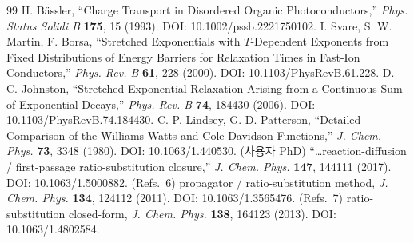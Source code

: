 \documentclass[11pt,a4paper]{article}
\begin{document}
\begin{thebibliography}{99}
 H. B\"assler, ``Charge Transport in Disordered Organic Photoconductors,''
  \emph{Phys. Status Solidi B} \textbf{175}, 15 (1993). DOI: 10.1002/pssb.2221750102.
 I. Svare, S. W. Martin, F. Borsa, ``Stretched Exponentials with $T$-Dependent
  Exponents from Fixed Distributions of Energy Barriers for Relaxation Times in Fast-Ion Conductors,''
  \emph{Phys. Rev. B} \textbf{61}, 228 (2000). DOI: 10.1103/PhysRevB.61.228.
 D. C. Johnston, ``Stretched Exponential Relaxation Arising from a Continuous Sum
  of Exponential Decays,'' \emph{Phys. Rev. B} \textbf{74}, 184430 (2006). DOI: 10.1103/PhysRevB.74.184430.
 C. P. Lindsey, G. D. Patterson, ``Detailed Comparison of the Williams-Watts and
  Cole-Davidson Functions,'' \emph{J. Chem. Phys.} \textbf{73}, 3348 (1980). DOI: 10.1063/1.440530.
 (사용자 PhD) ``\dots reaction-diffusion / first-passage ratio-substitution closure,''
  \emph{J. Chem. Phys.} \textbf{147}, 144111 (2017). DOI: 10.1063/1.5000882.
 (Refs.~6) propagator / ratio-substitution method, \emph{J. Chem. Phys.} \textbf{134},
  124112 (2011). DOI: 10.1063/1.3565476.
 (Refs.~7) ratio-substitution closed-form, \emph{J. Chem. Phys.} \textbf{138}, 164123
  (2013). DOI: 10.1063/1.4802584.
\end{thebibliography}
\end{document}
